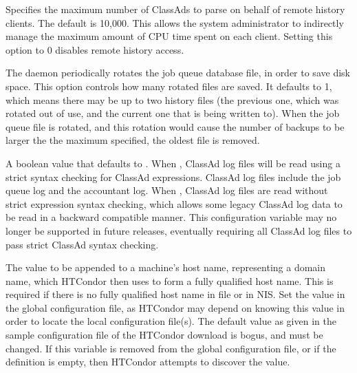 \begin{description}
\label{param:HistoryHelperMaxHistory}
\item[\Macro{HISTORY\_HELPER\_MAX\_HISTORY}]
  Specifies the maximum number of ClassAds to parse on behalf of remote history
  clients.  The default is 10,000.  This allows the system administrator to
  indirectly manage the maximum amount of CPU time spent on each client.
  Setting this option to 0 disables remote history access.

\label{param:MaxJobQueueLogRotations}
\item[\Macro{MAX\_JOB\_QUEUE\_LOG\_ROTATIONS}]
  The  daemon periodically rotates the job queue database file,
  in order to save disk space.  
  This option controls how many rotated files are saved.  
  It defaults to 1, which means there may be up to two history
  files (the previous one, which was rotated out of use, and the current one
  that is being written to).  When the job queue file is rotated,
  and this rotation would cause the number of backups to be larger
  the the maximum specified, the oldest file is removed.

\label{param:ClassadLogStrictParsing}
\item[\Macro{CLASSAD\_LOG\_STRICT\_PARSING}]
  A boolean value that defaults to . 
  When , ClassAd log files will be read using 
  a strict syntax checking for ClassAd expressions.  
  ClassAd log files include the job queue log and the accountant log.
  When , 
  ClassAd log files are read without strict expression syntax checking, 
  which allows some legacy ClassAd log data to be read in a backward
  compatible manner.  
  This configuration variable may no longer be supported in future releases, 
  eventually requiring all ClassAd log files to pass strict 
  ClassAd syntax checking. 

\label{param:DefaultDomainName}
\item[\Macro{DEFAULT\_DOMAIN\_NAME}]
  The value to be appended to a machine's host name,
  representing a domain name, which HTCondor then uses
  to form a fully qualified host name.
  This is required if there is no fully qualified host name 
  in file  or in NIS.
  Set the value in the global configuration file,
  as HTCondor may depend on knowing this value in order to locate
  the local configuration file(s).
  The default value as given in the sample configuration file of
  the HTCondor download is bogus, and must be changed.
  If this variable is removed from the global configuration file,
  or if the definition is empty, then HTCondor attempts to discover
  the value.


\end{description}
